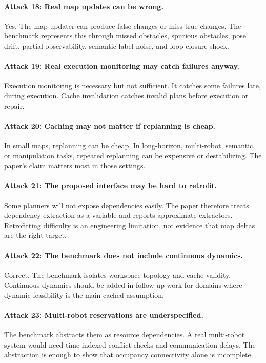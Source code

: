 \documentclass{article}
\begin{document}
\paragraph{Attack 18: Real map updates can be wrong.}
Yes. The map updater can produce false changes or miss true changes. The benchmark represents this through missed obstacles, spurious obstacles, pose drift, partial observability, semantic label noise, and loop-closure shock.

\paragraph{Attack 19: Real execution monitoring may catch failures anyway.}
Execution monitoring is necessary but not sufficient. It catches some failures late, during execution. Cache invalidation catches invalid plans before execution or repair.

\paragraph{Attack 20: Caching may not matter if replanning is cheap.}
In small maps, replanning can be cheap. In long-horizon, multi-robot, semantic, or manipulation tasks, repeated replanning can be expensive or destabilizing. The paper's claim matters most in those settings.

\paragraph{Attack 21: The proposed interface may be hard to retrofit.}
Some planners will not expose dependencies easily. The paper therefore treats dependency extraction as a variable and reports approximate extractors. Retrofitting difficulty is an engineering limitation, not evidence that map deltas are the right target.

\paragraph{Attack 22: The benchmark does not include continuous dynamics.}
Correct. The benchmark isolates workspace topology and cache validity. Continuous dynamics should be added in follow-up work for domains where dynamic feasibility is the main cached assumption.

\paragraph{Attack 23: Multi-robot reservations are underspecified.}
The benchmark abstracts them as resource dependencies. A real multi-robot system would need time-indexed conflict checks and communication delays. The abstraction is enough to show that occupancy connectivity alone is incomplete.
\end{document}
